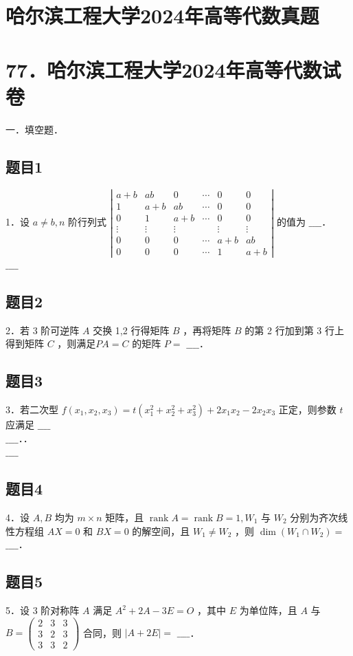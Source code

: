 \documentclass{article}
\begin{document}
\section*{哈尔滨工程大学2024年高等代数真题}
\section*{77．哈尔滨工程大学2024年高等代数试卷}
一．填空题．\\

\subsection{题目1}
1．设 \(a \neq b, n\) 阶行列式 \(\left|\begin{array}{cccccc}a+b & a b & 0 & \cdots & 0 & 0 \\ 1 & a+b & a b & \cdots & 0 & 0 \\ 0 & 1 & a+b & \cdots & 0 & 0 \\ \vdots & \vdots & \vdots & & \vdots & \vdots \\ 0 & 0 & 0 & \cdots & a+b & a b \\ 0 & 0 & 0 & \cdots & 1 & a+b\end{array}\right|\) 的值为 \(\_\_\_\_\)．\\
\(\_\_\_\_\)

\subsection{题目2}
2．若 3 阶可逆阵 \(A\) 交换 1,2 行得矩阵 \(B\) ，再将矩阵 \(B\) 的第 2 行加到第 3 行上得到矩阵 \(C\) ，则满足\(P A=C\) 的矩阵 \(P=\) \(\_\_\_\_\)．

\subsection{题目3}
3．若二次型 \(f\left(x_{1}, x_{2}, x_{3}\right)=t\left(x_{1}^{2}+x_{2}^{2}+x_{3}^{2}\right)+2 x_{1} x_{2}-2 x_{2} x_{3}\) 正定，则参数 \(t\) 应满足 \(\_\_\_\_\)\\
\(\_\_\_\_\)．．\\
\(\_\_\_\_\)

\subsection{题目4}
4．设 \(A, B\) 均为 \(m \times n\) 矩阵，且 \(\operatorname{rank} A=\operatorname{rank} B=1, W_{1}\) 与 \(W_{2}\) 分别为齐次线性方程组 \(A X=0\) 和 \(B X=0\) 的解空间，且 \(W_{1} \neq W_{2}\) ，则 \(\operatorname{dim}\left(W_{1} \cap W_{2}\right)=\) \(\_\_\_\_\)．

\subsection{题目5}
5．设 3 阶对称阵 \(A\) 满足 \(A^{2}+2 A-3 E=O\) ，其中 \(E\) 为单位阵，且 \(A\) 与 \(B=\left(\begin{array}{lll}2 & 3 & 3 \\ 3 & 2 & 3 \\ 3 & 3 & 2\end{array}\right)\) 合同，则 \(|A+2 E|=\) \(\_\_\_\_\)．
\end{document}
